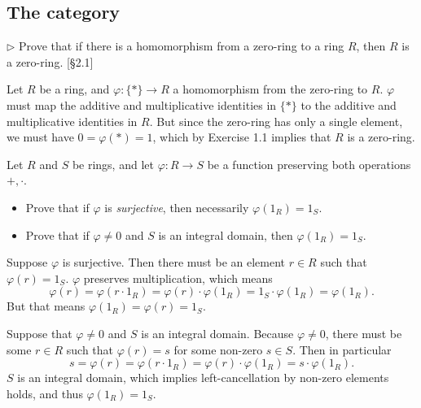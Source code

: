 \subsection{The category \Cring}

\begin{problem}
	$\triangleright$ Prove that if there is a homomorphism from a zero-ring to a ring $R$, then $R$ is a zero-ring. [\S 2.1]
\end{problem}

\begin{solution}
	Let $R$ be a ring, and $\varphi: \{*\} \to R$ a homomorphism from the zero-ring to $R$. $\varphi$ must map the additive and multiplicative identities in $\{*\}$ to the additive and multiplicative identities in $R$. But since the zero-ring has only a single element, we must have $0 = \varphi(*) = 1$, which by Exercise 1.1 implies that $R$ is a zero-ring.
\end{solution}

\begin{problem}
	Let $R$ and $S$ be rings, and let $\varphi: R \to S$ be a function preserving both operations $+, \cdot$.
	\begin{itemize}
		\item Prove that if $\varphi$ is \emph{surjective}, then necessarily $\varphi(1_R) = 1_S$.
		\item Prove that if $\varphi \neq 0$ and $S$ is an integral domain, then $\varphi(1_R) = 1_S$.
	\end{itemize}
\end{problem}

\begin{solution}
	Suppose $\varphi$ is surjective. Then there must be an element $r \in R$ such that $\varphi(r) = 1_S$. $\varphi$ preserves multiplication, which means
	\[
		\varphi(r) = \varphi(r \cdot 1_R) = \varphi(r) \cdot \varphi(1_R) = 1_S \cdot \varphi(1_R) = \varphi(1_R) \text{.}
	\]
	But that means $\varphi(1_R) = \varphi(r) = 1_S$.
	
	Suppose that $\varphi \neq 0$ and $S$ is an integral domain. Because $\varphi \neq 0$, there must be some $r \in R$ such that $\varphi(r) = s$ for some non-zero $s \in S$. Then in particular
	\[
		s = \varphi(r) = \varphi(r \cdot 1_R) = \varphi(r) \cdot \varphi(1_R) = s \cdot \varphi(1_R) \text{.}
	\]
	$S$ is an integral domain, which implies left-cancellation by non-zero elements holds, and thus $\varphi(1_R) = 1_S$.
\end{solution}

